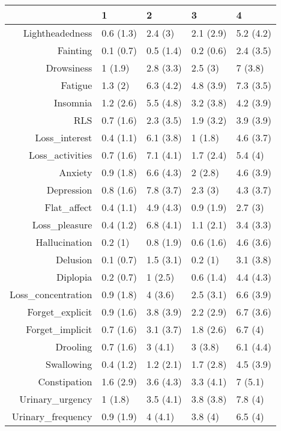 \begin{table}[ht]
\centering
\begin{tabular}{rllll}
  \toprule
 & 1 & 2 & 3 & 4 \\ 
  \midrule
Lightheadedness & 0.6 (1.3) & 2.4 (3) & 2.1 (2.9) & 5.2 (4.2) \\ 
  Fainting & 0.1 (0.7) & 0.5 (1.4) & 0.2 (0.6) & 2.4 (3.5) \\ 
  Drowsiness & 1 (1.9) & 2.8 (3.3) & 2.5 (3) & 7 (3.8) \\ 
  Fatigue & 1.3 (2) & 6.3 (4.2) & 4.8 (3.9) & 7.3 (3.5) \\ 
  Insomnia & 1.2 (2.6) & 5.5 (4.8) & 3.2 (3.8) & 4.2 (3.9) \\ 
  RLS & 0.7 (1.6) & 2.3 (3.5) & 1.9 (3.2) & 3.9 (3.9) \\ 
  Loss\_interest & 0.4 (1.1) & 6.1 (3.8) & 1 (1.8) & 4.6 (3.7) \\ 
  Loss\_activities & 0.7 (1.6) & 7.1 (4.1) & 1.7 (2.4) & 5.4 (4) \\ 
  Anxiety & 0.9 (1.8) & 6.6 (4.3) & 2 (2.8) & 4.6 (3.9) \\ 
  Depression & 0.8 (1.6) & 7.8 (3.7) & 2.3 (3) & 4.3 (3.7) \\ 
  Flat\_affect & 0.4 (1.1) & 4.9 (4.3) & 0.9 (1.9) & 2.7 (3) \\ 
  Loss\_pleasure & 0.4 (1.2) & 6.8 (4.1) & 1.1 (2.1) & 3.4 (3.3) \\ 
  Hallucination & 0.2 (1) & 0.8 (1.9) & 0.6 (1.6) & 4.6 (3.6) \\ 
  Delusion & 0.1 (0.7) & 1.5 (3.1) & 0.2 (1) & 3.1 (3.8) \\ 
  Diplopia & 0.2 (0.7) & 1 (2.5) & 0.6 (1.4) & 4.4 (4.3) \\ 
  Loss\_concentration & 0.9 (1.8) & 4 (3.6) & 2.5 (3.1) & 6.6 (3.9) \\ 
  Forget\_explicit & 0.9 (1.6) & 3.8 (3.9) & 2.2 (2.9) & 6.7 (3.6) \\ 
  Forget\_implicit & 0.7 (1.6) & 3.1 (3.7) & 1.8 (2.6) & 6.7 (4) \\ 
  Drooling & 0.7 (1.6) & 3 (4.1) & 3 (3.8) & 6.1 (4.4) \\ 
  Swallowing & 0.4 (1.2) & 1.2 (2.1) & 1.7 (2.8) & 4.5 (3.9) \\ 
  Constipation & 1.6 (2.9) & 3.6 (4.3) & 3.3 (4.1) & 7 (5.1) \\ 
  Urinary\_urgency & 1 (1.8) & 3.5 (4.1) & 3.8 (3.8) & 7.8 (4) \\ 
  Urinary\_frequency & 0.9 (1.9) & 4 (4.1) & 3.8 (4) & 6.5 (4) \\ 

\end{tabular}
\end{table}
